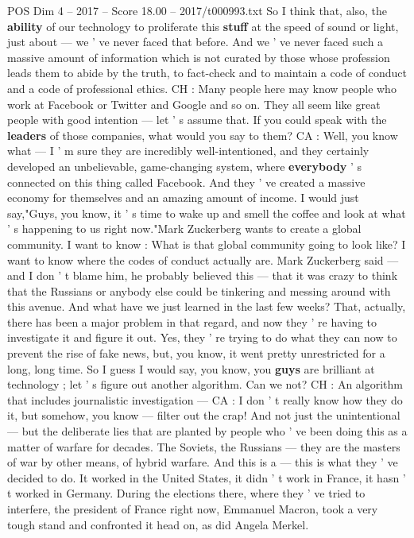 \begin{textsample}{POS Dim 4 – 2017 – Score 18.00 – 2017/t000993.txt}
So I think that, also, the \textbf{ability} of our technology to proliferate this \textbf{stuff} at the speed of sound or light, just about — we ' ve never faced that before.
And we ' ve never faced such a massive amount of information which is not curated by those whose profession leads them to abide by the truth, to fact-check and to maintain a code of conduct and a code of professional ethics.
CH : Many people here may know people who work at Facebook or Twitter and Google and so on.
They all seem like great people with good intention — let ' s assume that.
If you could speak with the \textbf{leaders} of those companies, what would you say to them?
CA : Well, you know what — I ' m sure they are incredibly well-intentioned, and they certainly developed an unbelievable, game-changing system, where \textbf{everybody} ' s connected on this thing called Facebook.
And they ' ve created a massive economy for themselves and an amazing amount of income.
I would just say,"Guys, you know, it ' s time to wake up and smell the coffee and look at what ' s happening to us right now."Mark Zuckerberg wants to create a global community.
I want to know : What is that global community going to look like?
I want to know where the codes of conduct actually are.
Mark Zuckerberg said — and I don ' t blame him, he probably believed this — that it was crazy to think that the Russians or anybody else could be tinkering and messing around with this avenue.
And what have we just learned in the last few weeks?
That, actually, there has been a major problem in that regard, and now they ' re having to investigate it and figure it out.
Yes, they ' re trying to do what they can now to prevent the rise of fake news, but, you know, it went pretty unrestricted for a long, long time.
So I guess I would say, you know, you \textbf{guys} are brilliant at technology ; let ' s figure out another algorithm.
Can we not?
CH : An algorithm that includes journalistic investigation — CA : I don ' t really know how they do it, but somehow, you know — filter out the crap!
And not just the unintentional — but the deliberate lies that are planted by people who ' ve been doing this as a matter of warfare for decades.
The Soviets, the Russians — they are the masters of war by other means, of hybrid warfare.
And this is a — this is what they ' ve decided to do.
It worked in the United States, it didn ' t work in France, it hasn ' t worked in Germany.
During the elections there, where they ' ve tried to interfere, the president of France right now, Emmanuel Macron, took a very tough stand and confronted it head on, as did Angela Merkel.

\end{textsample}
